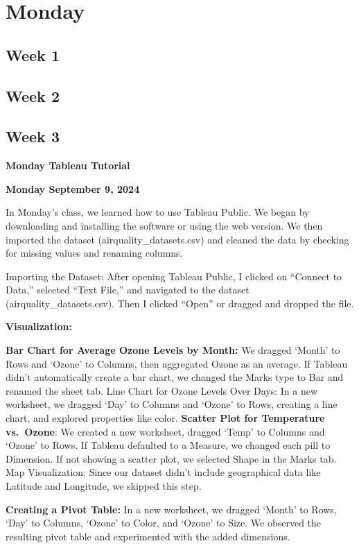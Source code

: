 \documentclass[
  letterpaper,
  DIV=11,
  numbers=noendperiod]{scrreprt}
\begin{document}
\section{Monday}\label{monday-1}

\subsection{Week 1}\label{week-1-6}

\subsection{Week 2}\label{week-2-6}

\subsection{Week 3}\label{week-3-4}

\textbf{Monday Tableau Tutorial}

\textbf{Monday September 9, 2024}

In Monday's class, we learned how to use Tableau Public. We began by
downloading and installing the software or using the web version. We
then imported the dataset (airquality\_datasets.csv) and cleaned the
data by checking for missing values and renaming columns.

Importing the Dataset: After opening Tableau Public, I clicked on
``Connect to Data,'' selected ``Text File,'' and navigated to the
dataset (airquality\_datasets.csv). Then I clicked ``Open'' or dragged
and dropped the file.

\textbf{Visualization:}

\textbf{Bar Chart for Average Ozone Levels by Month:} We dragged `Month'
to Rows and `Ozone' to Columns, then aggregated Ozone as an average. If
Tableau didn't automatically create a bar chart, we changed the Marks
type to Bar and renamed the sheet tab. Line Chart for Ozone Levels Over
Days: In a new worksheet, we dragged `Day' to Columns and `Ozone' to
Rows, creating a line chart, and explored properties like color.
\textbf{Scatter Plot for Temperature vs.~Ozone}: We created a new
worksheet, dragged `Temp' to Columns and `Ozone' to Rows. If Tableau
defaulted to a Measure, we changed each pill to Dimension. If not
showing a scatter plot, we selected Shape in the Marks tab. Map
Visualization: Since our dataset didn't include geographical data like
Latitude and Longitude, we skipped this step.

\textbf{Creating a Pivot Table:} In a new worksheet, we dragged `Month'
to Rows, `Day' to Columns, `Ozone' to Color, and `Ozone' to Size. We
observed the resulting pivot table and experimented with the added
dimensions.
\end{document}
